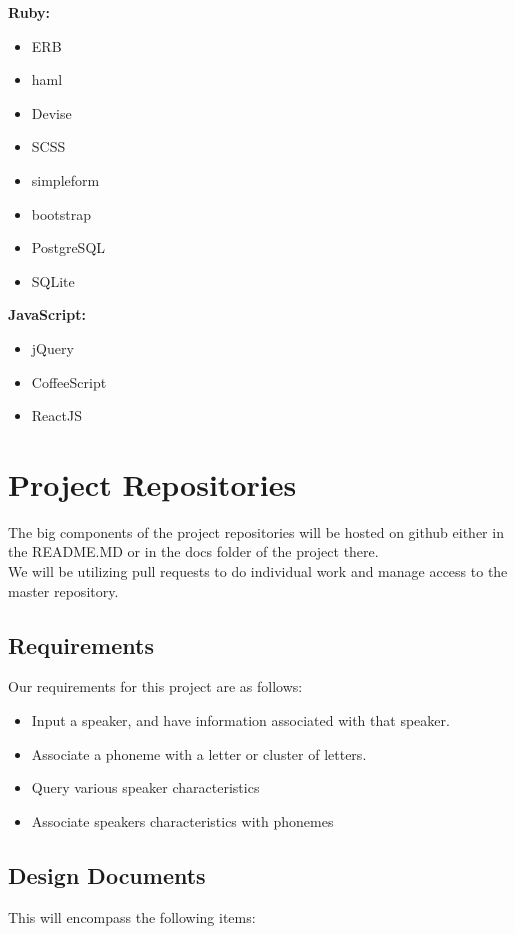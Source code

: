 \documentclass[12pt, a4paper, oneside]{article}
\begin{document}
\textbf{Ruby:}
\begin{itemize}
\item ERB
\item haml
\item Devise
\item SCSS
\item simpleform
\item bootstrap
\item PostgreSQL
\item SQLite \\
\end{itemize}
\textbf{JavaScript:}
\begin{itemize}
\item jQuery
\item CoffeeScript
\item ReactJS
\end{itemize}

\section*{Project Repositories}
The big components of the project repositories will be hosted on github either in the README.MD or in the docs folder of the project there.  \\

We will be utilizing pull requests to do individual work and manage access to the master repository.

\subsection*{Requirements}
Our requirements for this project are as follows:

\begin{itemize}
\item Input a speaker, and have information associated with that speaker.
\item Associate a phoneme with a letter or cluster of letters.
\item Query various speaker characteristics
\item Associate speakers characteristics with phonemes
\end{itemize}

\subsection*{Design Documents}

This will encompass the following items: 
\end{document}

